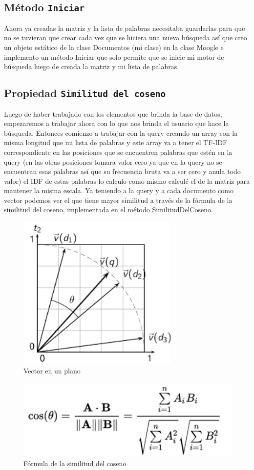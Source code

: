 \documentclass [a4paper,12pt]{article}
\begin{document}
\subsection{Método \texttt{Iniciar}}\label{sub:center}
Ahora ya creadas la matriz y la lista de palabras necesitaba guardarlas para que no se tuvieran que crear cada vez que se hiciera una nueva búsqueda así que creo un objeto estático de la clase Documentos (mi clase) en la clase Moogle e implemento un método Iniciar que solo permite que se inicie mi motor de búsqueda luego de creada la matriz y mi lista de palabras.
\subsection{Propiedad \texttt{Similitud del coseno}}\label{sub:center}
Luego de haber trabajado con los elementos que brinda la base de datos, empezaremos a trabajar ahora con lo que nos brinda el usuario que hace la búsqueda. Entonces comienzo a trabajar con la query creando un array con la misma longitud que mi lista de palabras y este array va a tener el TF-IDF correspondiente en las posiciones que se encuentren palabras que estén en la query (en las otras posiciones tomara valor cero ya que en la query no se encuentran esas palabras así que su frecuencia bruta va a ser cero y anula todo valor) el IDF de estas palabras lo calculo como mismo calculé el de la matriz para mantener la misma escala.
Ya teniendo a la query y a cada documento como vector podemos ver el que tiene mayor similitud a través de la fórmula de la similitud del coseno, implementada en el método SimilitudDelCoseno. 
\begin{figure}[h]
	\center
	\includegraphics[width = 8cm]{Picture1.png}
	\caption{Vector en un plano}
	\label{fig:plano}
\end{figure}
\begin{figure}[h]
	\center
	\includegraphics[width = 12cm]{Picture2.png}
	\caption{Fórmula de la similitud del coseno}
	\label{fig:fórmula}
\end{figure}
\end{document}

